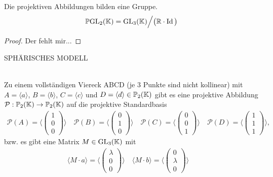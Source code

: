  \begin{thm} Die projektiven Abbildungen bilden eine Gruppe.
    \begin{align*}
      \mathbb{P} \mbox{GL}_2(\mathbb K) = \mbox{GL}_3(\mathbb K) \Big/ \big( \mathbb R \cdot \operatorname{Id} \big)
    \end{align*}
  \end{thm}

  \begin{proof}
    Der fehlt mir...
  \end{proof}
  
  SPHÄRISCHES MODELL
  
  \begin{thm}  \ \\
    Zu einem vollständigen Viereck ABCD (je $3$ Punkte sind nicht kollinear) mit $A=\langle a \rangle$, $B=\langle b \rangle$,
    $C=\langle c \rangle$ und $D=\langle d \rangle \in \mathbb{P}_2(\mathbb K)$ gibt es eine projektive Abbildung 
    $\mathcal P: \mathbb{P}_2(\mathbb K) \rightarrow \mathbb{P}_2(\mathbb K)$ auf die projektive Standardbasis
    \begin{align*}
      \mathcal{P}(A) = \langle \begin{pmatrix} 1 \\ 0 \\ 0 \end{pmatrix} \rangle \quad 
      \mathcal{P}(B) = \langle \begin{pmatrix} 0 \\ 1 \\ 0 \end{pmatrix} \rangle \quad    
      \mathcal{P}(C) = \langle \begin{pmatrix} 0 \\ 0 \\ 1 \end{pmatrix} \rangle \quad
      \mathcal{P}(D) = \langle \begin{pmatrix} 1 \\ 1 \\ 1 \end{pmatrix} \rangle ,
    \end{align*}
    bzw. es gibt eine Matrix $M\in \mbox{GL}_3(\mathbb K)$ mit
    \begin{align*}
      \langle M \cdot a \rangle = \langle \begin{pmatrix} \lambda \\ 0 \\ 0 \end{pmatrix} \rangle \quad
      \langle M \cdot b \rangle = \langle \begin{pmatrix} 0 \\ \lambda \\ 0 \end{pmatrix} \rangle \quad

\end{align*}
\end{thm}
